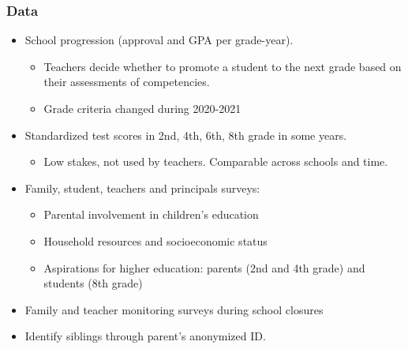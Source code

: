 \documentclass{beamer}
\begin{document}
\begin{frame}
    
    \label{frame:data}
    \frametitle{Data}

    \begin{itemize}
        \item School progression (approval and GPA per grade-year). 
        \begin{itemize}
            \item Teachers decide whether to promote a student to the next grade based on their assessments of competencies.
            \item Grade criteria changed during 2020-2021
        \end{itemize}
        \item Standardized test scores in 2nd, 4th, 6th, 8th grade in some years. 
        \begin{itemize}
            \item Low stakes, not used by teachers. Comparable across schools and time.
        \end{itemize}
        \item Family, student, teachers and principals surveys:
        \begin{itemize}
            \item Parental involvement in children's education
            \item Household resources and socioeconomic status
            \item Aspirations for higher education: parents (2nd and 4th grade) and students (8th grade)
        \end{itemize}
        \item Family and teacher monitoring surveys during school closures
        \item Identify siblings through parent's anonymized ID.
    \end{itemize}
\end{frame}
\end{document}
